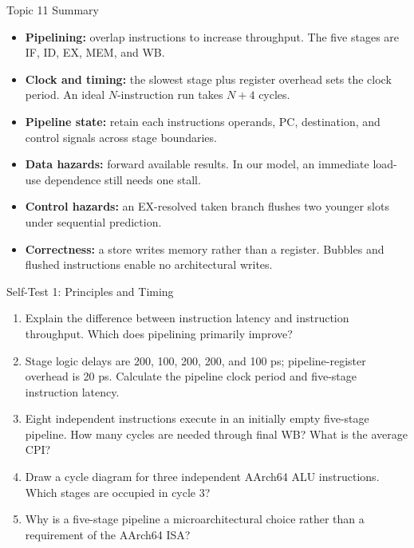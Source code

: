 \documentclass[aspectratio=169,11pt,t]{beamer}
\newcommand{\key}[1]{\textbf{#1}}
\begin{document}
\begin{frame}{Topic 11 Summary}

\begin{itemize}\setlength{\itemsep}{6pt}
  \item \key{Pipelining:} overlap instructions to increase throughput. The five stages are IF, ID, EX, MEM, and WB.
  \item \key{Clock and timing:} the slowest stage plus register overhead sets the clock period. An ideal $N$-instruction run takes $N+4$ cycles.
  \item \key{Pipeline state:} retain each instruction\textquotesingle s operands, PC, destination, and control signals across stage boundaries.
  \item \key{Data hazards:} forward available results. In our model, an immediate load-use dependence still needs one stall.
  \item \key{Control hazards:} an EX-resolved taken branch flushes two younger slots under sequential prediction.
  \item \key{Correctness:} a store writes memory rather than a register. Bubbles and flushed instructions enable no architectural writes.
\end{itemize}

\end{frame}

\begin{frame}{Self-Test 1: Principles and Timing}

\begin{enumerate}\setlength{\itemsep}{10pt}
\item Explain the difference between instruction latency and instruction throughput. Which does pipelining primarily improve?
\item Stage logic delays are 200, 100, 200, 200, and 100 ps; pipeline-register overhead is 20 ps. Calculate the pipeline clock period and five-stage instruction latency.
\item Eight independent instructions execute in an initially empty five-stage pipeline. How many cycles are needed through final WB? What is the average CPI?
\item Draw a cycle diagram for three independent AArch64 ALU instructions. Which stages are occupied in cycle 3?
\item Why is a five-stage pipeline a microarchitectural choice rather than a requirement of the AArch64 ISA?
\end{enumerate}

\end{frame}
\end{document}
